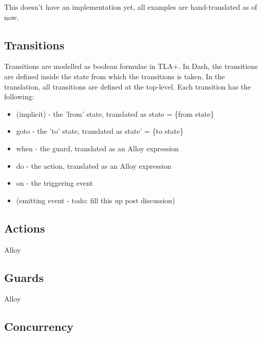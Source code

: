 This doesn't have an implementation yet, all examples are hand-translated as of now.

\subsection{Transitions}

Transitions are modelled as boolean formulae in TLA+. In Dash, the transitions are defined inside the state from which the transitions is taken. In the translation, all transitions are defined at the top-level. Each transition has the following:

\begin{itemize}
	\item (implicit) - the 'from' state, translated as state = \{from state\}
	\item goto - the 'to' state, translated as state' = \{to state\}
	\item when - the guard, translated as an Alloy expression
	\item do - the action, translated as an Alloy expression
	\item on - the triggering event
	\item (emitting event - todo: fill this up post discussion)
\end{itemize}

\subsection{Actions}

Alloy

\subsection{Guards}

Alloy

\subsection{Concurrency}

